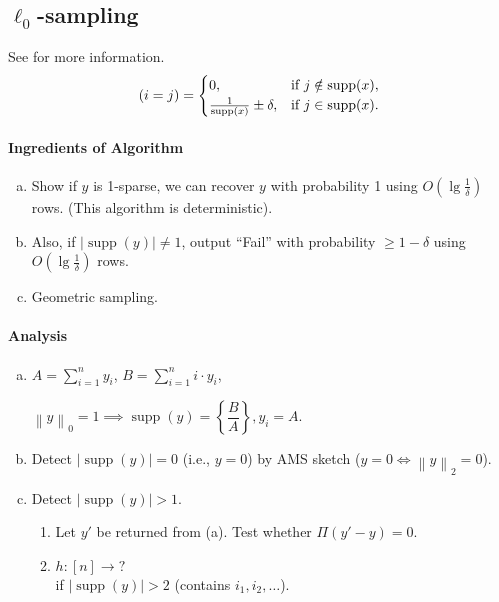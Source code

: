 \documentclass[11pt]{article}
\let\Pr\relax
\DeclareMathOperator*{\Pr}{\mathbb{P}}
\DeclareMathOperator{\supp}{supp}
\newcommand{\dl}{\delta}
\newcommand{\norm}[1]{\left\|#1\right\|}
\newcommand{\abs}[1]{\left\lvert#1\right\rvert}
\theoremstyle{definition}
\theoremstyle{remark}
\begin{document}
\subsection{$\ell_0$-sampling}
See \cite{CF14} for more information.
\[
\Pr(i=j)=
\begin{cases}
0, & \text{if }j\notin\supp(x), \\
\frac{1}{\supp(x)}\pm\dl, & \text{if }j\in\supp(x).
\end{cases}
\]

\paragraph{Ingredients of Algorithm}
\begin{enumerate}[(a)]
\item Show if $y$ is 1-sparse, we can recover $y$ with probability 1 using $O(\lg\frac{1}{\dl})$ rows. (This algorithm is deterministic).
\item Also, if $\abs{\supp(y)}\neq 1$, output ``Fail'' with probability $\geq 1-\dl$ using $O(\lg\frac{1}{\dl})$ rows.
\item Geometric sampling.
\end{enumerate}

\paragraph{Analysis}
\begin{enumerate}[(a)]
\item$A=\sum\limits_{i=1}^n y_i$, $B=\sum\limits_{i=1}^n i\cdot y_i$,

$\norm{y}_0=1\implies\supp(y)=\left\{\dfrac{B}{A}\right\}, y_i=A$.

\item Detect $\abs{\supp(y)}=0$ (i.e., $y=0$) by AMS sketch ($y=0\iff\norm{y}_2=0$).

\item Detect $\abs{\supp(y)}>1$.
	\begin{enumerate}[(1)]
	\item Let $y'$ be returned from (a). Test whether $\Pi(y'-y)=0$.
	\item $h:[n]\to\text{?}$ \\ %
		if $\abs{\supp(y)}>2$ (contains $i_1,i_2,\ldots$).
	\end{enumerate}
\end{enumerate}
\end{document}
